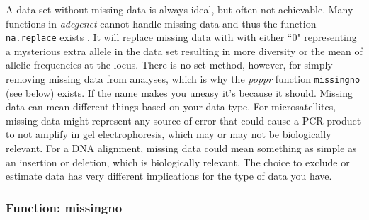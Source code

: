 \documentclass[letterpaper]{article}\usepackage[]{graphicx}\usepackage[]{color}
\newcommand{\tab}{\hspace*{1em}}
\newcommand{\poppr}{\textit{poppr}}
\newcommand{\adegenet}{\textit{adegenet}}
\begin{document}
\tab\tab A data set without missing data is always ideal, but often not achievable. Many functions in \adegenet{} cannot handle missing data and thus the function \texttt{na.replace} exists \cite{Jombart:2008}. It will replace missing data with with either ``0" representing a mysterious extra allele in the data set resulting in more diversity or the mean of allelic frequencies at the locus. There is no set method, however, for simply removing missing data from analyses, which is why the \poppr{} function \texttt{missingno} (see below) exists. If the name makes you uneasy it's because it should. Missing data can mean different things based on your data type. For microsatellites, missing data might represent any source of error that could cause a PCR product to not amplify in gel electrophoresis, which may or may not be biologically relevant. For a DNA alignment, missing data could mean something as simple as an insertion or deletion, which is biologically relevant. The choice to exclude or estimate data has very different implications for the type of data you have.
\subsubsection{Function: missingno}
\label{data.manip:missing:missingno}
\end{document}
